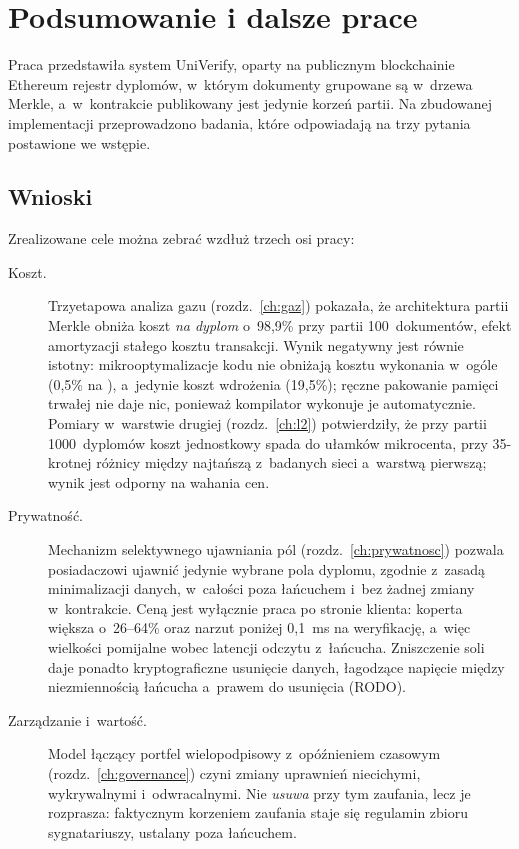 \chapter{Podsumowanie i dalsze prace}
\label{ch:podsumowanie}

Praca przedstawiła system UniVerify, oparty na publicznym blockchainie
Ethereum rejestr dyplomów, w~którym dokumenty grupowane są w~drzewa Merkle,
a~w~kontrakcie publikowany jest jedynie korzeń partii. Na zbudowanej implementacji
przeprowadzono badania, które odpowiadają na trzy pytania postawione we wstępie.

\section{Wnioski}
\label{sec:wnioski}

Zrealizowane cele można zebrać wzdłuż trzech osi pracy:

\begin{description}
  \item[Koszt.] Trzyetapowa analiza gazu (rozdz.~\ref{ch:gaz}) pokazała, że
        architektura partii Merkle obniża koszt \emph{na dyplom} o~98{,}9\% przy partii
        100~dokumentów, efekt amortyzacji stałego kosztu transakcji. Wynik
        negatywny jest równie istotny: mikrooptymalizacje kodu nie obniżają
        kosztu wykonania w~ogóle (0{,}5\% na ), a~jedynie koszt
        wdrożenia (19{,}5\%); ręczne pakowanie pamięci trwałej nie daje nic,
        ponieważ kompilator wykonuje je automatycznie. Pomiary w~warstwie
        drugiej (rozdz.~\ref{ch:l2}) potwierdziły, że przy partii 1000~dyplomów
        koszt jednostkowy spada do ułamków mikrocenta, przy 35-krotnej różnicy
        między najtańszą z~badanych sieci a~warstwą pierwszą; wynik jest odporny
        na wahania cen.
  \item[Prywatność.] Mechanizm selektywnego ujawniania pól
        (rozdz.~\ref{ch:prywatnosc}) pozwala posiadaczowi ujawnić jedynie wybrane
        pola dyplomu, zgodnie z~zasadą minimalizacji danych, w~całości poza łańcuchem
        i~bez żadnej zmiany w~kontrakcie. Ceną jest wyłącznie praca po stronie
        klienta: koperta większa o~26--64\% oraz narzut poniżej 0{,}1~ms na
        weryfikację, a~więc wielkości pomijalne wobec latencji odczytu z~łańcucha.
        Zniszczenie soli daje ponadto kryptograficzne usunięcie danych, łagodzące
        napięcie między niezmiennością łańcucha a~prawem do usunięcia (RODO).
  \item[Zarządzanie i~wartość.] Model łączący portfel wielopodpisowy
        z~opóźnieniem czasowym (rozdz.~\ref{ch:governance}) czyni zmiany uprawnień
        niecichymi, wykrywalnymi i~odwracalnymi. Nie \emph{usuwa} przy tym zaufania,
        lecz je rozprasza: faktycznym korzeniem zaufania staje się regulamin
        zbioru sygnatariuszy, ustalany poza łańcuchem.
\end{description}


